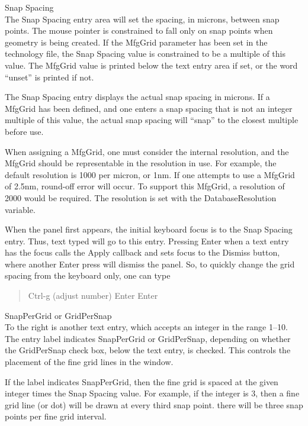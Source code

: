 \begin{description}
\item{\cb Snap Spacing}\\
The {\cb Snap Spacing} entry area will set the spacing, in microns,
between snap points.  The mouse pointer is constrained to fall only on
snap points when geometry is being created.  If the {\et MfgGrid}
parameter has been set in the technology file, the {\cb Snap Spacing}
value is constrained to be a multiple of this value.  The {\et
MfgGrid} value is printed below the text entry area if set, or the
word ``{\vt unset}'' is printed if not.

The {\cb Snap Spacing} entry displays the actual snap spacing in
microns.  If a {\vt MfgGrid} has been defined, and one enters a snap
spacing that is not an integer multiple of this value, the actual snap
spacing will ``snap'' to the closest multiple before use.

When assigning a {\vt MfgGrid}, one must consider the internal
resolution, and the {\vt MfgGrid} should be representable in the
resolution in use.  For example, the default resolution is 1000 per
micron, or 1nm.  If one attempts to use a {\vt MfgGrid} of 2.5nm,
round-off error will occur.  To support this {\vt MfgGrid}, a
resolution of 2000 would be required.  The resolution is set with the
{\et DatabaseResolution} variable.

When the panel first appears, the initial keyboard focus is to the
{\cb Snap Spacing} entry.  Thus, text typed will go to this entry. 
Pressing {\kb Enter} when a text entry has the focus calls the {\cb
Apply} callback and sets focus to the {\cb Dismiss} button, where
another {\cb Enter} press will dismiss the panel.  So, to quickly
change the grid spacing from the keyboard only, one can type

\begin{quote}
{\kb Ctrl-g} (adjust number) {\kb Enter Enter}
\end{quote}

\item{\cb SnapPerGrid} or {\cb GridPerSnap}\\
To the right is another text entry, which accepts an integer in the
range 1--10.  The entry label indicates {\cb SnapPerGrid} or {\cb
GridPerSnap}, depending on whether the {\cb GridPerSnap} check box,
below the text entry, is checked.  This controls the placement of the
fine grid lines in the window.

If the label indicates {\cb SnapPerGrid}, then the fine grid is spaced
at the given integer times the {\cb Snap Spacing} value.  For example,
if the integer is 3, then a fine grid line (or dot) will be drawn at
every third snap point.  there will be three snap points per fine grid
interval.


\end{description}
